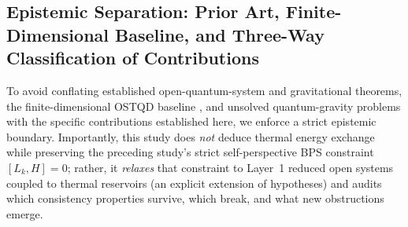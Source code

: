 \documentclass[11pt,a4paper]{article}
\theoremstyle{definition}
\theoremstyle{remark}
\newcommand{\1}{\mathbf{1}}
\begin{document}
\subsection{Epistemic Separation: Prior Art, Finite-Dimensional Baseline, and Three-Way Classification of Contributions}\label{sec:epistemic}

To avoid conflating established open-quantum-system and gravitational theorems, the finite-dimensional OSTQD baseline \cite{Soga2026OSTQD}, and unsolved quantum-gravity problems with the specific contributions established here, we enforce a strict epistemic boundary. Importantly, this study does \emph{not} deduce thermal energy exchange while preserving the preceding study's strict self-perspective BPS constraint $[L_k,H]=0$; rather, it \emph{relaxes} that constraint to Layer~1 reduced open systems coupled to thermal reservoirs (an explicit extension of hypotheses) and audits which consistency properties survive, which break, and what new obstructions emerge.
\end{document}

